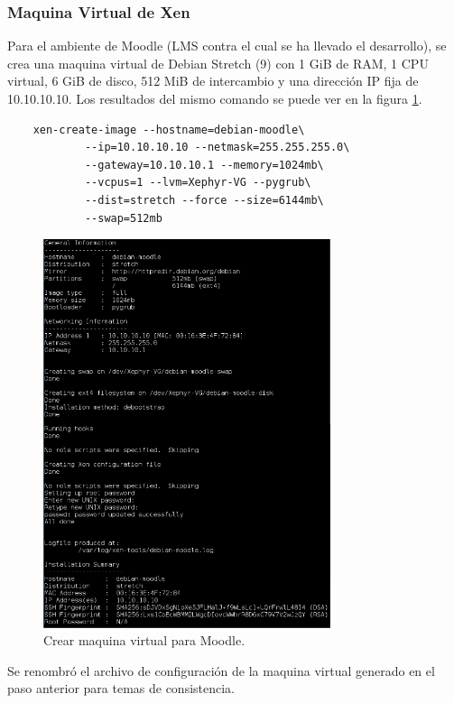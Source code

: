 \subsubsection{Maquina Virtual de Xen}
Para el ambiente de Moodle (LMS  contra el cual se ha llevado el desarrollo), se crea una maquina virtual de Debian Stretch (9) con 1 GiB de RAM, 1 CPU virtual, 6 GiB de disco, 512 MiB de intercambio y una dirección IP fija de 10.10.10.10. Los resultados del mismo comando se puede ver en la figura \ref{vm-moodle}.
\begin{lstlisting}
	xen-create-image --hostname=debian-moodle\
    		--ip=10.10.10.10 --netmask=255.255.255.0\
        	--gateway=10.10.10.1 --memory=1024mb\
        	--vcpus=1 --lvm=Xephyr-VG --pygrub\
        	--dist=stretch --force --size=6144mb\
        	--swap=512mb
\end{lstlisting}

\begin{figure}
	\begin{center}
    	\includegraphics[width=0.75\textwidth]{Figures/crear-moodle.png}
    \end{center}
  	\caption{Crear maquina virtual para Moodle.}
    \label{vm-moodle}
\end{figure}

Se renombró el archivo de configuración de la maquina virtual generado en el paso anterior para temas de consistencia.

